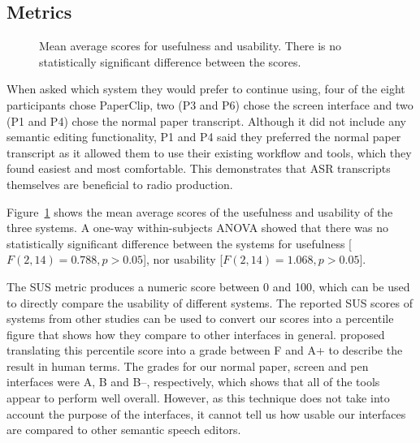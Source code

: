 \subsection{Metrics}\label{sec:paper-metrics}

\begin{figure}[p]
  \centering
  \caption[Mean average scores for usefulness and usability.]{Mean average scores for usefulness and usability. There
  is no statistically significant difference between the scores.}
  \label{fig:pen-useful-usable}
\end{figure}

When asked which system they would prefer to continue using, four of the eight participants chose PaperClip, two (P3
and P6) chose the screen interface and two (P1 and P4) chose the normal paper transcript.  Although it did not include
any semantic editing functionality, P1 and P4 said they preferred the normal paper transcript as it allowed them to use
their existing workflow and tools, which they found easiest and most comfortable.  This demonstrates that ASR
transcripts themselves are beneficial to radio production.

Figure~\ref{fig:pen-useful-usable} shows the mean average scores of the usefulness and usability of the three systems.
A one-way within-subjects ANOVA showed that there was no statistically significant difference between the systems for
usefulness [$F(2,14)=0.788, p>0.05$], nor usability [$F(2,14)=1.068, p>0.05$].

The SUS metric produces a numeric score between 0 and 100, which can be used to directly compare the usability of
different systems.
The reported SUS scores of systems from other studies can be used to convert our scores into a percentile figure that
shows how they compare to other interfaces in general.  \citet[p.~204]{Sauro2016} proposed translating this percentile
score into a grade between F and A+ to describe the result in human terms.
The grades for our normal paper, screen and pen interfaces were A, B and B--, respectively, which shows that all of the
tools appear to perform well overall.  However, as this technique does not take into account the purpose
of the interfaces, it cannot tell us how usable our interfaces are compared to other semantic speech editors.


